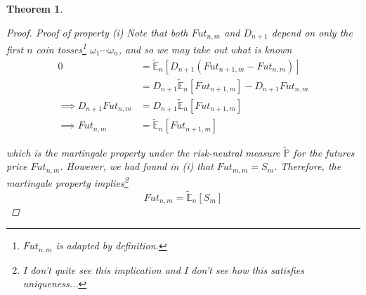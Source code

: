 \documentclass[12pt]{article}
\newtheorem{theorem}{Theorem}
\newlength\tindent
\renewcommand{\indent}{\hspace*{\tindent}}
\renewcommand{\P}{\mathbb P}
\newcommand{\E}{\mathbb E}
\begin{document}
\begin{theorem}
\begin{proof} {\em Proof of property (i)}
\indent Note that both $Fut_{n,m}$ and $D_{n + 1}$ depend on only the first $n$ coin tosses\footnote{$Fut_{n,m}$ is adapted by definition.} $\omega_1\cdots\omega_n$, and so we may take out what is known
\begin{align*}
	0 &= \tilde{\E}_n \left[ D_{n + 1}(Fut_{n + 1,m} - Fut_{n,m})\right] \\
	&= D_{n + 1} \tilde{\E}_n \left[ Fut_{n + 1,m} \right]  - D_{n + 1}Fut_{n,m} \\
	\implies D_{n + 1}Fut_{n,m} &= D_{n + 1}\tilde{\E}_n\left[ Fut_{n + 1,m} \right] \\
	\implies Fut_{n,m} &= \tilde{\E}_n \left[ Fut_{n + 1,m} \right]
\end{align*}

which is the martingale property under the risk-neutral measure $\tilde{\P}$ for the futures price $Fut_{n,m}$. However, we had found in (i) that $Fut_{m,m} = S_m$. Therefore, the martingale property implies\footnote{I don't quite see this implication and I don't see how this satisfies uniqueness...}
\begin{equation*}
	Fut_{n,m} = \tilde{\E}_n[S_m]
\end{equation*}
\end{proof}
\end{theorem}
\end{document}
